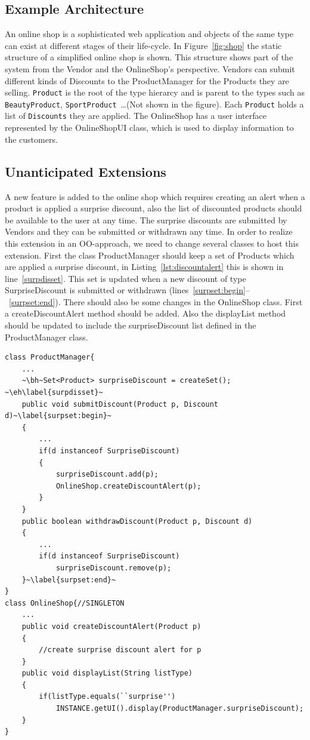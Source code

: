 \subsection{Example Architecture}
An online shop is a sophisticated web application and objects of the same type can exist at different stages of their life-cycle. In Figure~\ref{fig:shop} the static structure of a simplified online shop is shown. This structure shows part of the system from the \textsf{Vendor} and the \textsf{OnlineShop}'s perspective. \textsf{Vendor}s can submit different kinds of \textsf{Discount}s to the \textsf{ProductManager} for the \textsf{Product}s they are selling. \texttt{Product} is the root of the type hierarcy and is parent to the types such as \texttt{BeautyProduct}, \texttt{SportProduct}~\dots(Not shown in the figure). Each \texttt{Product} holds a list of \texttt{Discounts} they are applied. The \textsf{OnlineShop} has a user interface represented by the \textsf{OnlineShopUI} class, which is used to display information to the customers. 


\subsection{Unanticipated Extensions}
A new feature is added to the online shop which requires creating an alert when a product is applied a surprise discount, also the list of discounted products should be available to the user at any time. The surprise discounts are submitted by \textsf{Vendor}s and they can be submitted or withdrawn any time.  In order to realize this extension in an OO-approach, we need to change several classes to host this extension. First the class \textsf{ProductManager} should keep a set of \textsf{Product}s which are applied a surprise discount, in Listing~\ref{lst:discountalert} this is shown in line~\ref{surpdisset}. This set is updated when a new discount of type \textsf{SurpriseDiscount} is submitted or withdrawn (lines~\ref{surpset:begin}--~\ref{surpset:end}). There should also be some changes in the \textsf{OnlineShop} class. First a \textsf{createDiscountAlert} method should be added. Also the \textsf{displayList} method should be updated to include the \textsf{surpriseDiscount} list defined in the \textsf{ProductManager} class.


\begin{lstlisting}[float, caption={A Java implementation of discount alert concern}, label={lst:discountalert}]
class ProductManager{
	...
	~\bh~Set<Product> surpriseDiscount = createSet(); ~\eh\label{surpdisset}~
	public void submitDiscount(Product p, Discount d)~\label{surpset:begin}~
	{
		...
		if(d instanceof SurpriseDiscount)
		{
			surpriseDiscount.add(p);
			OnlineShop.createDiscountAlert(p);
		}
	}
	public boolean withdrawDiscount(Product p, Discount d)
	{
		...
		if(d instanceof SurpriseDiscount)
			surpriseDiscount.remove(p);
	}~\label{surpset:end}~
}
class OnlineShop{//SINGLETON
	...
	public void createDiscountAlert(Product p)
	{
		//create surprise discount alert for p
	}
	public void displayList(String listType)
	{
		if(listType.equals(``surprise'')
			INSTANCE.getUI().display(ProductManager.surpriseDiscount);
	}
}
\end{lstlisting}



